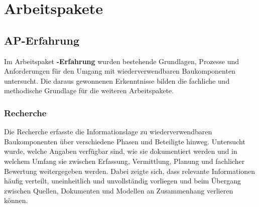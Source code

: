 \documentclass[type=zwischenbericht]{zukunftbau}
\begin{document}
\section{Arbeitspakete}

\subsection{AP-Erfahrung}

Im Arbeitspaket \textbf{-Erfahrung} wurden bestehende Grundlagen, Prozesse und Anforderungen für den Umgang mit wiederverwendbaren Baukomponenten untersucht. Die daraus gewonnenen Erkenntnisse bilden die fachliche und methodische Grundlage für die weiteren Arbeitspakete.

\subsubsection{Recherche}
Die Recherche erfasste die Informationslage zu wiederverwendbaren Baukomponenten über verschiedene Phasen und Beteiligte hinweg. Untersucht wurde, welche Angaben verfügbar sind, wie sie dokumentiert werden und in welchem Umfang sie zwischen Erfassung, Vermittlung, Planung und fachlicher Bewertung weitergegeben werden. Dabei zeigte sich, dass relevante Informationen häufig verteilt, uneinheitlich und unvollständig vorliegen und beim Übergang zwischen Quellen, Dokumenten und Modellen an Zusammenhang verlieren können.
\end{document}
